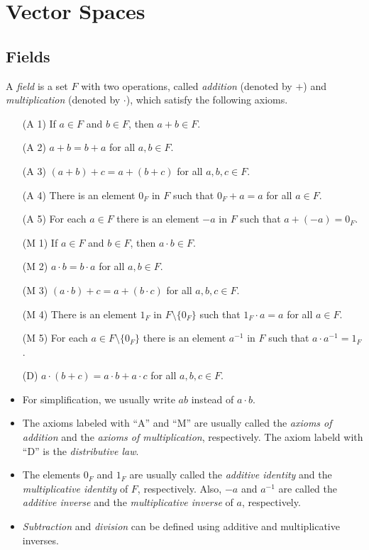 \chapter{Vector Spaces}
\section{Fields}
\begin{definition}\label{def:field}
  A \emph{field} is a set $F$ with two operations, called \emph{addition}
  (denoted by $+$) and \emph{multiplication} (denoted by $\cdot$), which
  satisfy the following axioms.
  \begin{enumerate}[leftmargin=3.5em]
    \item[(A 1)] If $a \in F$ and $b \in F$, then $a + b \in F$.
    \item[(A 2)] $a + b = b + a$ for all $a, b \in F$.
    \item[(A 3)] $(a + b) + c = a + (b + c)$ for all $a, b, c \in F$.
    \item[(A 4)] There is an element $0_F$ in $F$ such that $0_F + a = a$ for
      all $a \in F$. 
    \item[(A 5)] For each $a \in F$ there is an element $-a$ in $F$ such that
      $a + (-a) = 0_F$.
    \item[(M 1)] If $a \in F$ and $b \in F$, then $a \cdot b \in F$.
    \item[(M 2)] $a \cdot b = b \cdot a$ for all $a, b \in F$.
    \item[(M 3)] $(a \cdot b) + c = a + (b \cdot c)$ for all $a, b, c \in F$.
    \item[(M 4)] There is an element $1_F$ in $F \setminus \{0_F\}$ such that
      $1_F \cdot a = a$ for all $a \in F$.
    \item[(M 5)] For each $a \in F \setminus \{0_F\}$ there is an element
      $a^{-1}$ in $F$ such that $a \cdot a^{-1} = 1_F$.
    \item[(D)] $a \cdot (b + c) = a \cdot b + a \cdot c$ for all
      $a, b, c \in F$.
  \end{enumerate}
\end{definition}
\begin{remark} \leavevmode
  \begin{itemize}
    \item For simplification, we usually write $ab$ instead of $a \cdot b$.
    \item The axioms labeled with ``A'' and ``M'' are usually called the
      \emph{axioms of addition} and the \emph{axioms of multiplication},
      respectively. The axiom labeld with ``D'' is the \emph{distributive law}.
    \item The elements $0_F$ and $1_F$ are usually called the
      \emph{additive identity} and the \emph{multiplicative identity} of $F$,
      respectively.
      Also, $-a$ and $a^{-1}$ are called the \emph{additive inverse} and the
      \emph{multiplicative inverse} of $a$, respectively.
    \item \emph{Subtraction} and \emph{division} can be defined using additive
      and multiplicative inverses.
  \end{itemize}
\end{remark}

